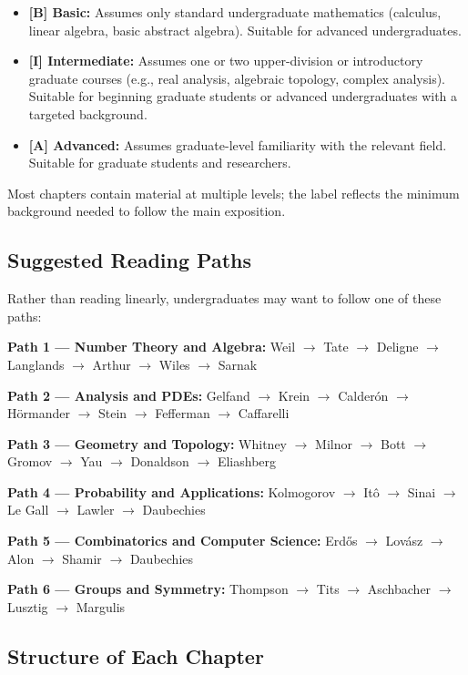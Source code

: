 \begin{itemize}
    \item \textbf{[B] Basic:} Assumes only standard undergraduate mathematics (calculus, linear algebra, basic abstract algebra). Suitable for advanced undergraduates.
    \item \textbf{[I] Intermediate:} Assumes one or two upper-division or introductory graduate courses (e.g., real analysis, algebraic topology, complex analysis). Suitable for beginning graduate students or advanced undergraduates with a targeted background.
    \item \textbf{[A] Advanced:} Assumes graduate-level familiarity with the relevant field. Suitable for graduate students and researchers.
\end{itemize}

Most chapters contain material at multiple levels; the label reflects the minimum background needed to follow the main exposition.

\subsection{Suggested Reading Paths}

Rather than reading linearly, undergraduates may want to follow one of these paths:

\textbf{Path 1 --- Number Theory and Algebra:}
Weil $\to$ Tate $\to$ Deligne $\to$ Langlands $\to$ Arthur $\to$ Wiles $\to$ Sarnak

\textbf{Path 2 --- Analysis and PDEs:}
Gelfand $\to$ Krein $\to$ Calder\'on $\to$ H\"ormander $\to$ Stein $\to$ Fefferman $\to$ Caffarelli

\textbf{Path 3 --- Geometry and Topology:}
Whitney $\to$ Milnor $\to$ Bott $\to$ Gromov $\to$ Yau $\to$ Donaldson $\to$ Eliashberg

\textbf{Path 4 --- Probability and Applications:}
Kolmogorov $\to$ It\^o $\to$ Sinai $\to$ Le Gall $\to$ Lawler $\to$ Daubechies

\textbf{Path 5 --- Combinatorics and Computer Science:}
Erd\H{o}s $\to$ Lov\'asz $\to$ Alon $\to$ Shamir $\to$ Daubechies

\textbf{Path 6 --- Groups and Symmetry:}
Thompson $\to$ Tits $\to$ Aschbacher $\to$ Lusztig $\to$ Margulis

\subsection{Structure of Each Chapter}

